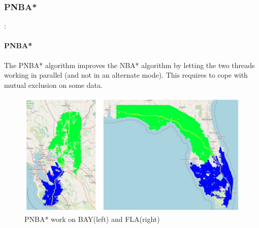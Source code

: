 \documentclass[12pt]{beamer}
\begin{document}
	\subsubsection{PNBA*}
	\begin{frame}{\secname : \subsecname}
		\framesubtitle{PNBA*}
		The PNBA* algorithm improves the NBA* algorithm by letting the two threads working in
		parallel (and not in an alternate mode). This requires to cope with mutual exclusion on some data.
		\begin{figure}[ht!]
			\centering
			\includegraphics[width=0.7\linewidth]{pnba/pnbamap.png}
			\caption{PNBA* work on BAY(left) and FLA(right)}
			\label{pnbamap}
		\end{figure}
	\end{frame}
\end{document}
